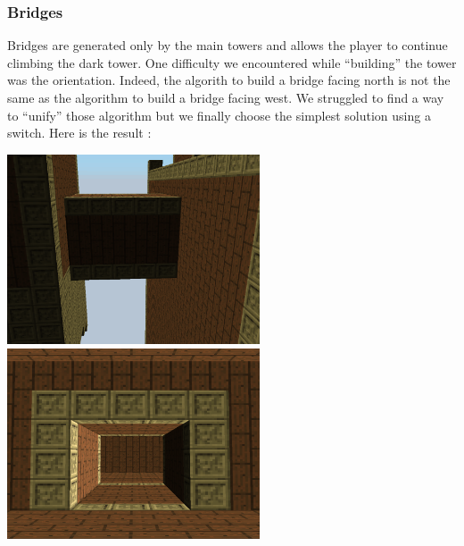 \documentclass[article]{report}         %
\begin{document}
        \subsubsection{Bridges}
          Bridges are generated only by the main towers and allows the player to continue climbing the dark tower. One difficulty we encountered while ``building'' the tower was the orientation. Indeed, the algorith to build a bridge facing north is not the same as the algorithm to build a bridge facing west. We struggled to find a way to ``unify'' those algorithm but we finally choose the simplest solution using a switch. Here is the result :
          \begin{center}
            \includegraphics[width=7.5cm]{images/DT/bridge1.png}
            \includegraphics[width=7.5cm]{images/DT/bridge2.png}
          \end{center}
\end{document}
